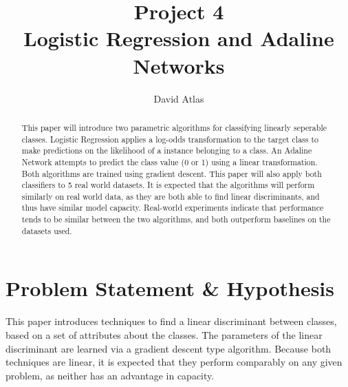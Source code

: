\documentclass{amsart}
\title{Project 4 \\ Logistic Regression and Adaline Networks}
\author{David Atlas}
\begin{document}
    \begin{abstract}
    This paper will introduce two parametric algorithms for
    classifying linearly seperable classes. Logistic Regression
    applies a log-odds transformation to the target class to make predictions
    on the likelihood of a instance belonging to a class.
    An Adaline Network attempts to predict the class value (0 or 1) using
    a linear transformation. Both algorithms are trained using gradient
    descent. This paper will also apply both classifiers to 5 real
    world datasets. It is expected that the algorithms will perform
    similarly on real world data, as they are both able to find linear
    discriminants, and thus have similar model capacity. Real-world experiments
    indicate that performance tends to be similar between the two algorithms,
    and both outperform baselines on the datasets used.
    \end{abstract}

    \maketitle

    \section{Problem Statement \& Hypothesis}
    This paper introduces techniques to find a linear discriminant
    between classes, based on a set of attributes about the classes.
    The parameters of the linear discriminant are learned via a
    gradient descent type algorithm. Because both techniques are linear,
    it is expected that they perform comparably on any given problem, as neither has an
    advantage in capacity.
\end{document}
